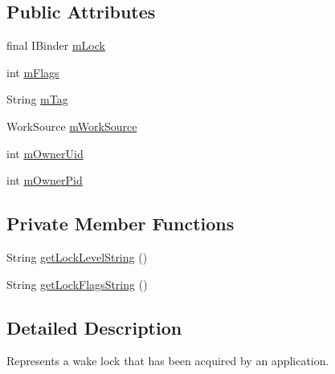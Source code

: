 \subsection*{Public Attributes}
\begin{DoxyCompactItemize}
\item 
final I\-Binder \hyperlink{classcom_1_1android_1_1server_1_1power_1_1PowerManagerService_1_1WakeLock_a76c89eeab17e7fa6c123402c0f16b465}{m\-Lock}
\item 
int \hyperlink{classcom_1_1android_1_1server_1_1power_1_1PowerManagerService_1_1WakeLock_ac793472ecf0ccf4a4a092e68665a723d}{m\-Flags}
\item 
String \hyperlink{classcom_1_1android_1_1server_1_1power_1_1PowerManagerService_1_1WakeLock_a47ef3e3e27c1fc0713216cd0fc61ffc1}{m\-Tag}
\item 
Work\-Source \hyperlink{classcom_1_1android_1_1server_1_1power_1_1PowerManagerService_1_1WakeLock_a03db7c30d4fd8ea5d43e93da2eeee761}{m\-Work\-Source}
\item 
int \hyperlink{classcom_1_1android_1_1server_1_1power_1_1PowerManagerService_1_1WakeLock_ae246d978c568f114317d1b607abd4527}{m\-Owner\-Uid}
\item 
int \hyperlink{classcom_1_1android_1_1server_1_1power_1_1PowerManagerService_1_1WakeLock_af63e9af33d89b05d24584eea695c5e30}{m\-Owner\-Pid}
\end{DoxyCompactItemize}
\subsection*{Private Member Functions}
\begin{DoxyCompactItemize}
\item 
String \hyperlink{classcom_1_1android_1_1server_1_1power_1_1PowerManagerService_1_1WakeLock_ad5ab92ed7351ac510403884add98d40e}{get\-Lock\-Level\-String} ()
\item 
String \hyperlink{classcom_1_1android_1_1server_1_1power_1_1PowerManagerService_1_1WakeLock_a78d8c1ba4c0c04250f0171c2689e04ba}{get\-Lock\-Flags\-String} ()
\end{DoxyCompactItemize}


\subsection{Detailed Description}
Represents a wake lock that has been acquired by an application. 

